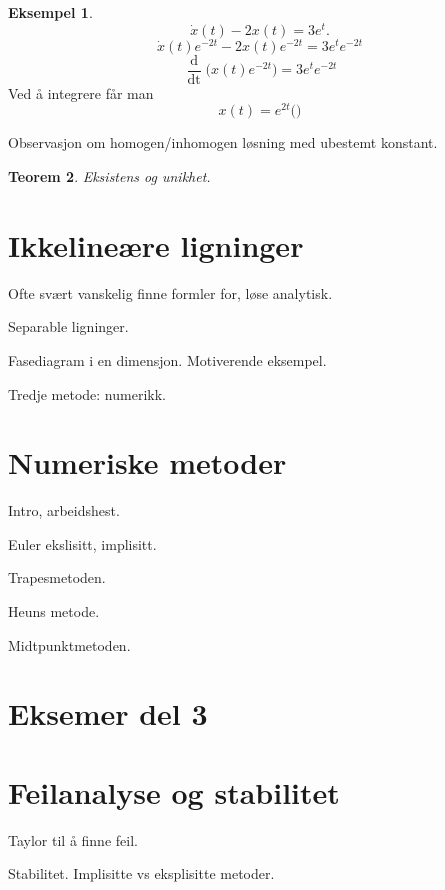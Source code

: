 \documentclass{article}
\theoremstyle{plain}
\newtheorem{teorem}{Teorem}\surroundwithmdframed{teorem}
\theoremstyle{definition}
\newtheorem{eksempel}[teorem]{Eksempel}
\theoremstyle{remark}
\newcommand{\diff}[1]{\mathop{d#1}}
\newcommand{\fcn}{x}
\newcommand{\expfcn}[1]{e^{#1}}
\newcommand{\bigparanth}[1]{\big(#1\big)}
\newcommand{\biggparanth}[1]{\bigg(#1\bigg)}
\begin{document}
\begin{eksempel}
    \begin{equation*}
        \dot{\fcn}(t) - 2\fcn(t) = 3\expfcn{t}.
    \end{equation*}
    \begin{equation*}
        \dot{\fcn}(t) \expfcn{-2t} - 2\fcn(t) \expfcn{-2t} = 3\expfcn{t} \expfcn{-2t}
    \end{equation*}
    \begin{equation*}
        \frac{\diff{}}{\diff{t}} \bigparanth{\fcn(t) \expfcn{-2t}} = 3\expfcn{t} \expfcn{-2t}
    \end{equation*}
    Ved å integrere får man
    \begin{equation*}
        x(t) = \expfcn{2t} \biggparanth{}
    \end{equation*}
\end{eksempel}


Observasjon om homogen/inhomogen løsning med ubestemt konstant.

\begin{teorem}
    Eksistens og unikhet.
\end{teorem}

\section*{Ikkelineære ligninger}

Ofte svært vanskelig finne formler for, løse analytisk.

Separable ligninger.

Fasediagram i en dimensjon. Motiverende eksempel.

Tredje metode: numerikk.


\section*{Numeriske metoder}

Intro, arbeidshest.

Euler ekslisitt, implisitt.

Trapesmetoden.

Heuns metode.

Midtpunktmetoden.


\section*{Eksemer del 3}


\section*{Feilanalyse og stabilitet}

Taylor til å finne feil.

Stabilitet. Implisitte vs eksplisitte metoder.
\end{document}
